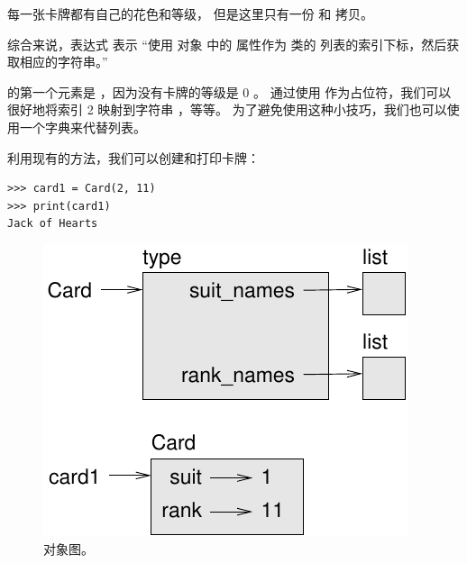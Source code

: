 
每一张卡牌都有自己的花色和等级，
但是这里只有一份  和  拷贝。


综合来说，表达式  表示 ``使用  对象
中的  属性作为  类的  
列表的索引下标，然后获取相应的字符串。''


 的第一个元素是  ，因为没有卡牌的等级是 0 。
通过使用  作为占位符，我们可以很好地将索引 2 映射到字符串  ，等等。
为了避免使用这种小技巧，我们也可以使用一个字典来代替列表。


利用现有的方法，我们可以创建和打印卡牌：

\begin{lstlisting}
>>> card1 = Card(2, 11)
>>> print(card1)
Jack of Hearts
\end{lstlisting}

\begin{figure}
\centerline
{\includegraphics[scale=0.8]{../source/figs/card1.pdf}}
\caption{对象图。}
\label{fig.card1}
\end{figure}

